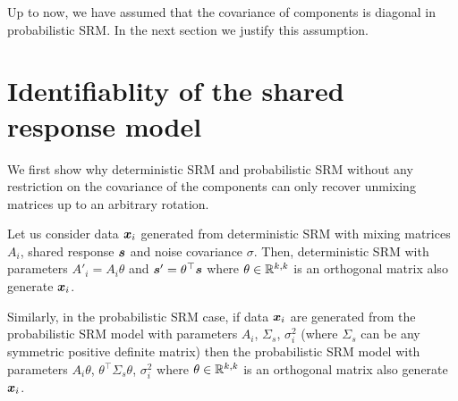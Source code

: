 
  Up to now, we have assumed that the covariance of components is diagonal in
  probabilistic SRM. In the next section we justify this assumption.

\section{Identifiablity of the shared response model}
We first show why deterministic SRM and probabilistic SRM without any
restriction on the covariance of the components can
only recover unmixing matrices up to an arbitrary rotation.

Let us consider data $\boldsymbol{x}_i$ generated from deterministic SRM with
mixing matrices $A_i$, shared response $\boldsymbol{s}$ and noise covariance $\sigma$.
Then, deterministic SRM with parameters $A'_i = A_i \theta$ and $\boldsymbol{s}' = \theta^{\top} \boldsymbol{s}$ where
$\theta \in \mathbb{R}^{k, k}$ is an orthogonal matrix also
generate $\boldsymbol{x}_i$.

Similarly, in the probabilistic SRM case, if data $\boldsymbol{x}_i$ are generated from the
probabilistic SRM model with 
parameters $A_i$, $\Sigma_s$, $\sigma_i^2$ (where $\Sigma_s$ can be any
symmetric positive definite
matrix) then the probabilistic SRM model with parameters $A_i\theta$, $\theta^{\top} \Sigma_s \theta$, $\sigma_i^2$  where
$\theta \in \mathbb{R}^{k, k}$ is an orthogonal matrix also generate $\boldsymbol{x}_i$.

